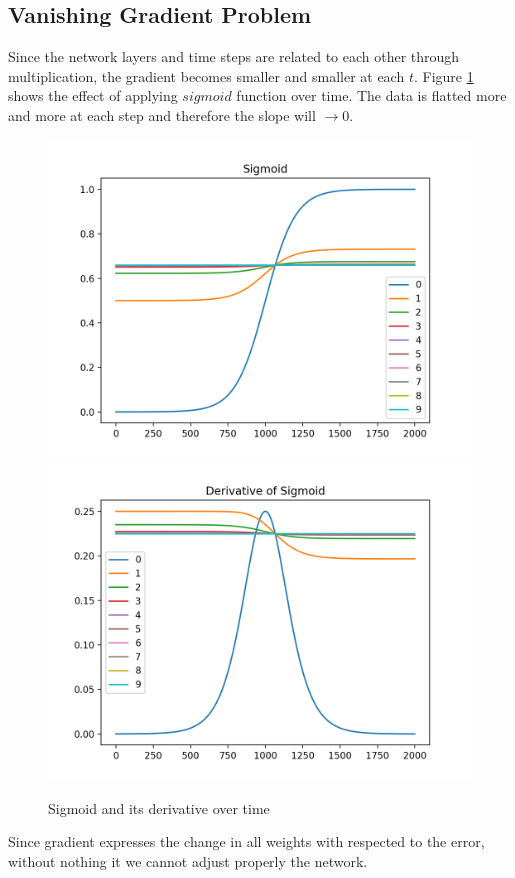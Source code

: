\documentclass[11pt]{article}
\begin{document}
\subsection{Vanishing Gradient Problem}
Since the network layers and time steps are related to each other through multiplication, the gradient becomes smaller and smaller at each $t$. Figure \ref{fig: sigmoid_over_time} shows the effect of applying $sigmoid$ function over time. The data is flatted more and more at each step and therefore the slope will $\rightarrow 0$.
\begin{figure}[H]
\includegraphics[scale=0.5]{images/sigmoid_gradient_vanish}
\includegraphics[scale=0.5]{images/sigmoid_gradient_vanish_derivative}
\caption{Sigmoid and its derivative over time}
\label{fig: sigmoid_over_time}	
\end{figure}
Since gradient expresses the change in all weights with respected to the error, without nothing it we cannot adjust properly the network.
\end{document}
